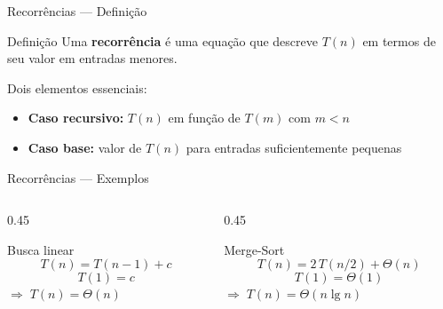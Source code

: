 \documentclass[aspectratio=169]{beamer}
\newcommand{\impt}[1]{\textcolor{maccent}{\textbf{#1}}}
\begin{document}
\begin{frame}{Recorrências --- Definição}
\begin{block}{Definição}
Uma \textbf{recorrência} é uma equação que descreve $T(n)$ em termos de seu valor em entradas menores.
\end{block}

\vspace{0.3cm}
\pause

Dois elementos essenciais:
\begin{itemize}
    \item \impt{Caso recursivo:} $T(n)$ em função de $T(m)$ com $m < n$
    \pause
    \item \impt{Caso base:} valor de $T(n)$ para entradas suficientemente pequenas
\end{itemize}
\end{frame}


\begin{frame}{Recorrências --- Exemplos}
\begin{columns}[T]
\begin{column}{0.45\textwidth}
\begin{block}{Busca linear}
\[
T(n) = T(n-1) + c
\]
\[
T(1) = c
\]
\centering $\Rightarrow\; T(n) = \Theta(n)$
\end{block}
\end{column}

\pause

\begin{column}{0.45\textwidth}
\begin{block}{Merge-Sort}
\[
T(n) = 2\,T(n/2) + \Theta(n)
\]
\[
T(1) = \Theta(1)
\]
\centering $\Rightarrow\; T(n) = \Theta(n \lg n)$
\end{block}
\end{column}
\end{columns}
\end{frame}

\end{document}
